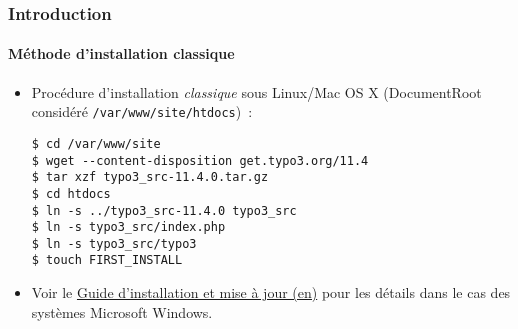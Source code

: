 %

\begin{frame}[fragile]
	\frametitle{Introduction}
	\framesubtitle{Méthode d'installation classique}


	\begin{itemize}
		\item Procédure d'installation \textit{classique} sous Linux/Mac OS X\newline
			(DocumentRoot considéré \texttt{/var/www/site/htdocs})~:
\begin{lstlisting}
$ cd /var/www/site
$ wget --content-disposition get.typo3.org/11.4
$ tar xzf typo3_src-11.4.0.tar.gz
$ cd htdocs
$ ln -s ../typo3_src-11.4.0 typo3_src
$ ln -s typo3_src/index.php
$ ln -s typo3_src/typo3
$ touch FIRST_INSTALL
\end{lstlisting}

		\item Voir le \href{https://docs.typo3.org/m/typo3/guide-installation/master/en-us/}{Guide d'installation et mise à jour (en)}
			pour les détails dans le cas des systèmes Microsoft Windows.

	\end{itemize}
\end{frame}


